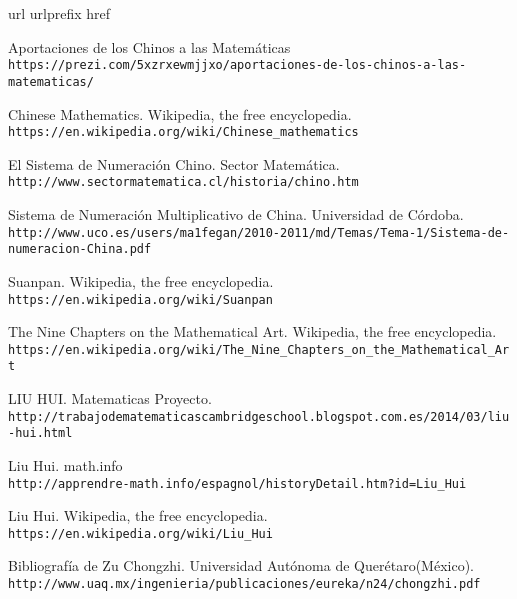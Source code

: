 \begin{thebibliography}{10}
\expandafter\ifx\csname url\endcsname\relax
  \def\url#1{\texttt{#1}}\fi
\expandafter\ifx\csname urlprefix\endcsname\relax\def\urlprefix{URL }\fi
\expandafter\ifx\csname href\endcsname\relax
  \def\href#1#2{#2} \def\path#1{#1}\fi

Aportaciones de los Chinos a las Matemáticas\\
  \url{https://prezi.com/5xzrxewmjjxo/aportaciones-de-los-chinos-a-las-matematicas/}

Chinese Mathematics. Wikipedia, the free encyclopedia.\\
  \url{https://en.wikipedia.org/wiki/Chinese_mathematics}

El Sistema de Numeración Chino. Sector Matemática.\\
  \url{http://www.sectormatematica.cl/historia/chino.htm}

Sistema de Numeración Multiplicativo de China. Universidad de Córdoba.\\
  \url{http://www.uco.es/users/ma1fegan/2010-2011/md/Temas/Tema-1/Sistema-de-numeracion-China.pdf}

Suanpan. Wikipedia, the free encyclopedia.\\
  \url{https://en.wikipedia.org/wiki/Suanpan}
  
The Nine Chapters on the Mathematical Art. Wikipedia, the free encyclopedia.\\
  \url{https://en.wikipedia.org/wiki/The_Nine_Chapters_on_the_Mathematical_Art}  
  
LIU HUI. Matematicas Proyecto.\\
  \url{http://trabajodematematicascambridgeschool.blogspot.com.es/2014/03/liu-hui.html}

Liu Hui. math.info\\
  \url{http://apprendre-math.info/espagnol/historyDetail.htm?id=Liu_Hui}
  
Liu Hui. Wikipedia, the free encyclopedia.\\
  \url{https://en.wikipedia.org/wiki/Liu_Hui}
  
Bibliografía de Zu Chongzhi. Universidad Autónoma de Querétaro(México).\\
  \url{http://www.uaq.mx/ingenieria/publicaciones/eureka/n24/chongzhi.pdf}


\end{thebibliography}
